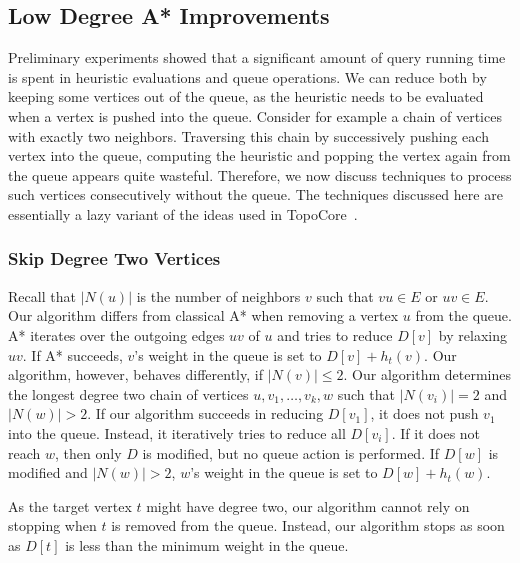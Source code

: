 \documentclass[manuscript,review]{acmart}
\begin{document}
\subsection{Low Degree A* Improvements}\label{sec:low-deg-improvment}

Preliminary experiments showed that a significant amount of query running time is spent in heuristic evaluations and queue operations.
We can reduce both by keeping some vertices out of the queue, as the heuristic needs to be evaluated when a vertex is pushed into the queue.
Consider for example a chain of vertices with exactly two neighbors.
Traversing this chain by successively pushing each vertex into the queue, computing the heuristic and popping the vertex again from the queue appears quite wasteful.
Therefore, we now discuss techniques to process such vertices consecutively without the queue.
The techniques discussed here are essentially a lazy variant of the ideas used in TopoCore~\cite{DBLP:conf/gis/DibbeltSW15}.


\subsubsection{Skip Degree Two Vertices}

Recall that $|N(u)|$ is the number of neighbors $v$ such that $vu \in E$ or $uv \in E$.
Our algorithm differs from classical A* when removing a vertex $u$ from the queue.
A* iterates over the outgoing edges $uv$ of $u$ and tries to reduce $D[v]$ by relaxing $uv$.
If A* succeeds, $v$'s weight in the queue is set to $D[v]+h_t(v)$.
Our algorithm, however, behaves differently, if $|N(v)|\le 2$.
Our algorithm determines the longest degree two chain of vertices $u, v_1,\ldots, v_k, w$ such that $|N(v_i)|=2$ and $|N(w)| > 2$.
If our algorithm succeeds in reducing $D[v_1]$, it does not push $v_1$ into the queue.
Instead, it iteratively tries to reduce all $D[v_i]$.
If it does not reach $w$, then only $D$ is modified, but no queue action is performed.
If $D[w]$ is modified and $|N(w)|>2$, $w$'s weight in the queue is set to $D[w]+h_t(w)$.

As the target vertex $t$ might have degree two, our algorithm cannot rely on stopping when $t$ is removed from the queue.
Instead, our algorithm stops as soon as $D[t]$ is less than the minimum weight in the queue.
\end{document}
